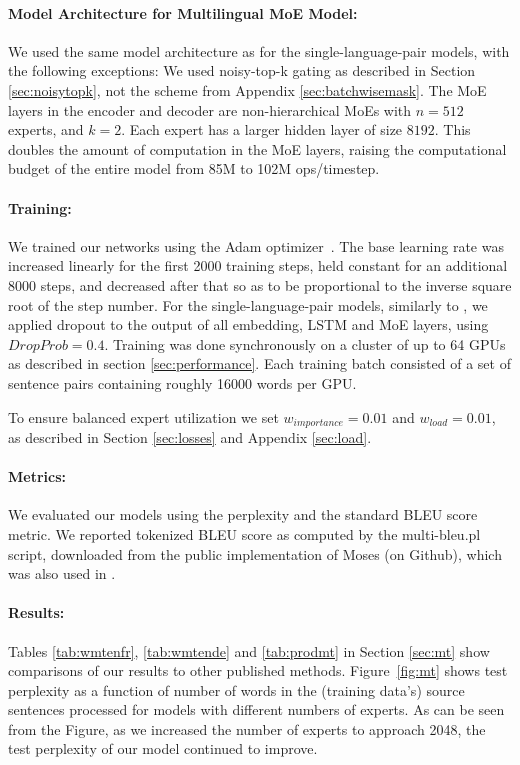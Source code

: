 \documentclass{article} %
\begin{document}
\paragraph{Model Architecture for Multilingual MoE Model:} We used the same model architecture as for the single-language-pair models, with the following exceptions:  We used noisy-top-k gating as described in Section \ref{sec:noisytopk}, not the scheme from Appendix \ref{sec:batchwisemask}.  The MoE layers in the encoder and decoder are non-hierarchical MoEs with $n=512$ experts, and $k=2$.  Each expert has a larger hidden layer of size $8192$.  This doubles the amount of computation in the MoE layers, raising the computational budget of the entire model from 85M to 102M ops/timestep.

\paragraph{Training:} We trained our networks using the Adam optimizer~\citep{kingma2014adam}. The base learning rate was increased linearly for the first 2000 training steps, held constant for an additional 8000 steps, and decreased after that so as to be proportional to the inverse square root of the step number.  For the single-language-pair models, similarly to \citep{GNMT}, we applied dropout \citep{ZarembaSV14} to the output of all embedding, LSTM and MoE layers, using $DropProb=0.4$.  Training was done synchronously on a cluster of up to 64 GPUs as described in section \ref{sec:performance}.  Each training batch consisted of a set of sentence pairs containing roughly 16000 words per GPU.

To ensure balanced expert utilization we set $w_{importance}=0.01$ and $w_{load}=0.01$, as described in Section \ref{sec:losses} and Appendix \ref{sec:load}.


\paragraph{Metrics:} We evaluated our models using the perplexity and the standard BLEU score metric. We reported tokenized BLEU score as computed by the multi-bleu.pl script, downloaded from the public implementation of Moses (on Github), which was also used in \citep{LuongPM:2015:EAANMT}. 

\paragraph{Results:} Tables \ref{tab:wmtenfr}, \ref{tab:wmtende} and \ref{tab:prodmt} in Section \ref{sec:mt} show comparisons of our results to other published methods.  Figure~\ref{fig:mt} shows test perplexity as a function of number of words in the (training data's) source sentences processed for models with different numbers of experts.  As can be seen from the Figure, as we increased the number of experts to approach 2048, the test perplexity of our model continued to improve. 
\end{document}
